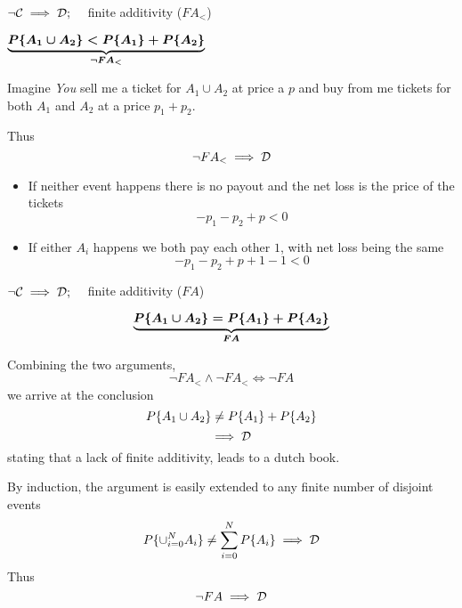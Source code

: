 \begin{frame}{$\neg\mathcal{C}\implies\mathcal{D};\quad$ finite additivity ($FA_<$)}


\begin{minipage}[]{0.45\linewidth}
\begin{minipage}[]{\linewidth}
{$\bm{\underbrace{P\{A_1\cup A_2\}<P\{A_1\}+P\{A_2\}}_{\neg FA_<}}$}
\bigskip

Imagine \emph{You} sell me a ticket for $A_1\cup A_2$ at price a $p$ and buy from me tickets for both $A_1$ and $A_2$ at a price $p_1+p_2$. 
\end{minipage}
\vfill
\bigskip
\begin{minipage}[]{\linewidth}
Thus
$$\neg FA_<\implies \mathcal{D}$$
\end{minipage}
\end{minipage}
\hfill
\begin{minipage}[]{0.45\linewidth}
\begin{itemize}\itemsep1.2em
\item If neither event happens there is no payout and the net loss is the price of the tickets
$$-p_1-p_2+p<0$$

\item If either $A_i$ happens we both pay each other $1$, with net loss being the same
$$-p_1-p_2+p+1-1<0$$

\end{itemize}
\end{minipage}

\end{frame}

\begin{frame}{$\neg\mathcal{C}\implies\mathcal{D};\quad$ finite additivity ($FA$)}
\begin{minipage}{\linewidth}
\begingroup
\setlength{\belowdisplayskip}{2pt}
{$$\bm{\underbrace{P\{A_1\cup A_2\}=P\{A_1\}+P\{A_2\}}_{FA}}$$}
\endgroup
\end{minipage}
\vfill
\begin{minipage}[]{0.45\linewidth}
\begingroup
\setlength{\abovedisplayskip}{3pt}
\setlength{\belowdisplayskip}{3pt}

Combining the two arguments,
$$\neg FA_<\land \neg FA_<\iff \neg FA$$
we arrive at the conclusion
$$P\{A_1\cup A_2\}\ne P\{A_1\}+P\{A_2\}$$
$$\implies\mathcal{D}$$
stating that a lack of finite additivity, leads to a dutch book.
\endgroup
\end{minipage}
\hfill
\begin{minipage}[]{0.45\linewidth}
By induction, the argument is easily extended to any finite number of disjoint events
$$P\{\cup_{i=0}^N A_i\}\ne\sum_{i=0}^N P\{A_i\}\implies\mathcal{D}$$
Thus
$$\neg FA\implies \mathcal{D}$$
\end{minipage}

\end{frame}

